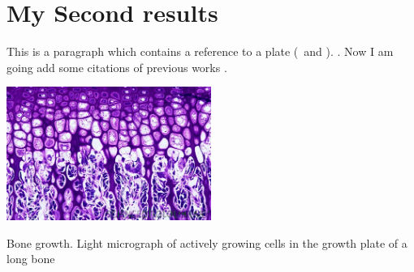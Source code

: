\documentclass[12pt, oneside]{book}
\begin{document}
	
	
\section{My Second results}

This is a paragraph which contains a reference to a plate (~and ). \lipsum*[11-17]. Now I am going add some citations of previous works \parencite{Devi2012,Karlsson2021,BBS2022}.

\begin{plate}[]
\centering
\includegraphics[width=0.5\textwidth]{figures/plateR1}
\caption{Bone growth. Light micrograph of actively growing cells in the growth plate of a long bone}
\label{plateR1}
\end{plate}


\lipsum*[2-4]


\end{document}
